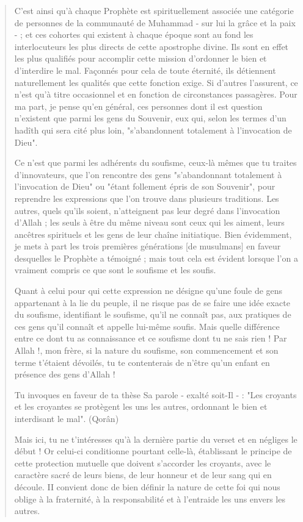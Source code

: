 \begin{quote}
C'est ainsi qu'à chaque Prophète est spirituellement associée une
catégorie de personnes de la communauté de Muhammad - sur lui la grâce
et la paix - ; et ces cohortes qui existent à chaque époque sont au fond
les interlocuteurs les plus directs de cette apostrophe divine. Ils sont
en effet les plus qualifiés pour accomplir cette mission d'ordonner le
bien et d'interdire le mal. Façonnés pour cela de toute éternité, ils
détiennent naturellement les qualités que cette fonction exige. Si
d'autres l'assurent, ce n'est qu'à titre occasionnel et en fonction de
circonstances passagères. Pour ma part, je pense qu'en général, ces
personnes dont il est question n'existent que parmi les gens du
Souvenir, eux qui, selon les termes d'un hadîth qui sera cité plus loin,
"s'abandonnent totalement à l'invocation de Dieu".

Ce n'est que parmi les adhérents du soufisme, ceux-là mêmes que tu
traites d'innovateurs, que l'on rencontre des gens "s'abandonnant
totalement à l'invocation de Dieu" ou "étant follement épris de son
Souvenir", pour reprendre les expressions que l'on trouve dans plusieurs
traditions. Les autres, quels qu'ils soient, n'atteignent pas leur degré
dans l'invocation d'Allah ; les seuls à être du même niveau sont ceux
qui les aiment, leurs ancêtres spirituels et les gens de leur chaîne
initiatique. Bien évidemment, je mets à part les trois premières
générations {[}de musulmans{]} en faveur desquelles le Prophète a
témoigné ; mais tout cela est évident lorsque l'on a vraiment compris ce
que sont le soufisme et les soufis.

Quant à celui pour qui cette expression ne désigne qu'une foule de gens
appartenant à la lie du peuple, il ne risque pas de se faire une idée
exacte du soufisme, identifiant le soufisme, qu'il ne connaît pas, aux
pratiques de ces gens qu'il connaît et appelle lui-même soufis. Mais
quelle différence entre ce dont tu as connaissance et ce soufisme dont
tu ne sais rien ! Par Allah !, mon frère, si la nature du soufisme, son
commencement et son terme t'étaient dévoilés, tu te contenterais de
n'être qu'un enfant en présence des gens d'Allah !

Tu invoques en faveur de ta thèse Sa parole - exalté soit-Il - : "Les
croyants et les croyantes se protègent les uns les autres, ordonnant le
bien et interdisant le mal". (Qorân)

Mais ici, tu ne t'intéresses qu'à la dernière partie du verset et en
négliges le début ! Or celui-ci conditionne pourtant celle-là,
établissant le principe de cette protection mutuelle que doivent
s'accorder les croyants, avec le caractère sacré de leurs biens, de leur
honneur et de leur sang qui en découle. II convient donc de bien définir
la nature de cette foi qui nous oblige à la fraternité, à la
responsabilité et à l'entraide les uns envers les autres.


\end{quote}
